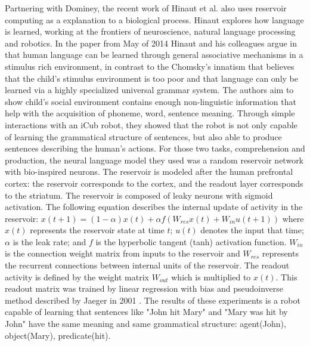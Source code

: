 \documentclass[12pt,oneside]{CUNY_CS_PhD}
\begin{document}
Partnering with Dominey, the recent work of Hinaut et al. \cite{hinaut_2012, hinaut_exploring_2014} also uses reservoir computing as a explanation to a biological process. Hinaut explores how language is learned, working at the frontiers of neuroscience, natural language processing and robotics. In the paper from May of 2014 \cite{hinaut_exploring_2014} Hinaut and his colleagues argue in that human language can be learned through general associative mechanisms in a stimulus rich environment, in contrast to the Chomsky's innatism that believes that the child's stimulus environment is too poor and that language can only be learned via a highly specialized universal grammar system.  The authors aim to show child's social environment contains enough non-linguistic information that help with the acquisition of phoneme, word, sentence meaning. Through simple interactions with an iCub robot, they showed that the robot is not only capable of learning the grammatical structure of sentences, but also able to produce sentences describing the human's actions. For those two tasks, comprehension and production, the neural language model they used was a random reservoir network with bio-inspired neurons. The reservoir is modeled after the human prefrontal cortex: the reservoir corresponds to the cortex, and the readout layer corresponds to the striatum. The reservoir is composed of leaky neurons with sigmoid activation. The following equation describes the internal update of activity in the reservoir: $x(t + 1) = (1 − \alpha)x(t) + \alpha f (W_{res}x(t ) + W_{in}u(t + 1))$ where $x(t)$ represents the reservoir state at time $t$; $u(t)$ denotes the input that time;$\alpha$ is the leak rate; and $f$ is the hyperbolic tangent (tanh) activation function. $W_{in}$ is the connection weight matrix from inputs to the reservoir and $W_{res}$ represents the recurrent connections between internal units of the reservoir. The readout activity is defined by the weight matrix $W_{out}$ which is multiplied to $x(t)$. This readout matrix was trained by linear regression with bias and pseudoinverse method described by Jaeger in 2001 \cite{jaeger_echo_2001}. The results of these experiments is a robot capable of learning that sentences like "John hit Mary" and "Mary was hit by John" have the same meaning and same grammatical structure: agent(John), object(Mary), predicate(hit).
\end{document}
